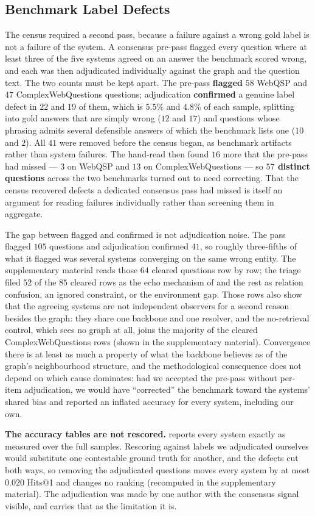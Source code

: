 \subsection{Benchmark Label Defects}\label{sec:defects}

The census required a second pass, because a failure against a wrong
gold label is not a failure of the system. A consensus pre-pass flagged
every question where at least three of the five systems agreed on an
answer the benchmark scored wrong, and each was then adjudicated
individually against the graph and the question text. The two counts
must be kept apart. The pre-pass \textbf{flagged} $58$ WebQSP and $47$
ComplexWebQuestions questions; adjudication \textbf{confirmed} a genuine
label defect in $22$ and $19$ of them, which is $5.5\%$ and $4.8\%$ of
each sample, splitting into gold answers that are simply wrong ($12$ and
$17$) and questions whose phrasing admits several defensible answers of
which the benchmark lists one ($10$ and $2$). All $41$ were removed
before the census began, as benchmark artifacts rather than system
failures. The hand-read then found $16$ more that the pre-pass had
missed --- $3$ on WebQSP and $13$ on ComplexWebQuestions --- so
\textbf{$57$ distinct questions} across the two benchmarks turned out to
need correcting. That the census recovered defects a dedicated consensus
pass had missed is itself an argument for reading failures individually
rather than screening them in aggregate.

The gap between flagged and confirmed is not adjudication noise. The
pass flagged $105$ questions and adjudication confirmed $41$, so roughly
three-fifths of what it flagged was several systems converging on the
same wrong entity. The supplementary material reads those $64$ cleared
questions row by row; the triage filed $52$ of the $85$ cleared rows as
the echo mechanism of  and the rest as relation
confusion, an ignored constraint, or the environment gap. Those rows
also show that the agreeing systems are not independent observers for a
second reason besides the graph: they share one backbone and one
resolver, and the no-retrieval control, which sees no graph at all,
joins the majority of the cleared ComplexWebQuestions rows (shown in the
supplementary material). Convergence there is at least as much a
property of what the backbone believes as of the graph's neighbourhood
structure, and the methodological consequence does not depend on which
cause dominates: had we accepted the pre-pass without per-item
adjudication, we would have ``corrected'' the benchmark toward the
systems' shared bias and reported an inflated accuracy for every system,
including our own.

\textbf{The accuracy tables are not rescored.} 
reports every system exactly as measured over the full samples.
Rescoring against labels we adjudicated ourselves would substitute one
contestable ground truth for another, and the defects cut both ways, so
removing the adjudicated questions moves every system by at most $0.020$
Hits@1 and changes no ranking (recomputed in the supplementary
material). The adjudication was made by one author with the consensus
signal visible, and  carries that as the
limitation it is.
